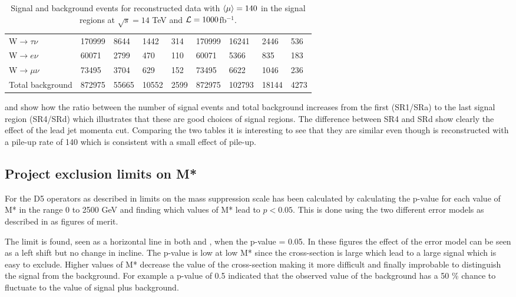 \begin{landscape}
\begin{table}[ht]
\begin{center}
\begin{tabular}{|l|l|l|l|l !{\vrule width 4pt} l|l|l|l|}
W$\rightarrow\tau\nu$ & 170999 & 8644 & 1442 & 314 & 170999 & 16241 & 2446 & 536 \\
W$\rightarrow e\nu$ & 60071 & 2799 & 470 & 110 & 60071 & 5366 & 835 & 183 \\
W$\rightarrow\mu\nu$ & 73495 & 3704 & 629 & 152 & 73495 & 6622 & 1046 & 236 \\ \hline
Total background & 872975 & 55665 & 10552 & 2599 & 872975 & 102793 & 18144 & 4273 \\ \hline 
\end{tabular}
\caption{Signal and background events for reconstructed data with $\left<\mu\right>=140$ in the signal regions at $\sqrt{s}=14$ TeV and $\mathcal{L}=1000$fb$^{-1}$.}
\label{tab:srreco1}
\end{center}
\end{table}
\end{landscape}
 and  show how the ratio between the number of signal events and total background increases from the first (SR1/SRa) to the last signal region (SR4/SRd) which illustrates that these are good choices of signal regions. The difference between SR4 and SRd show clearly the effect of the lead jet momenta cut. Comparing the two tables it is interesting to see that they are similar even though  is reconstructed with a pile-up rate of 140 which is consistent with a small effect of pile-up.
\subsection{Project exclusion limits on M*}\label{sec:res:subsec:m*}
For the D5 operators as described in  limits on the mass suppression scale has been calculated by calculating the p-value for each value of M* in the range 0 to 2500 GeV and finding which values of M* lead to $p<0.05$. This is done using the two different error models as described in  as figures of merit.

The limit is found, seen as a horizontal line in both  and , when the p-value = 0.05. In these figures the effect of the error model can be seen as a left shift but no change in incline. The p-value is low at low M* since the cross-section is large which lead to a large signal which is easy to exclude. Higher values of M* decrease the value of the cross-section making it more difficult and finally improbable to distinguish the signal from the background. For example a p-value of 0.5 indicated that the observed value of the background has a 50 \% chance to fluctuate to the value of signal plus background.


